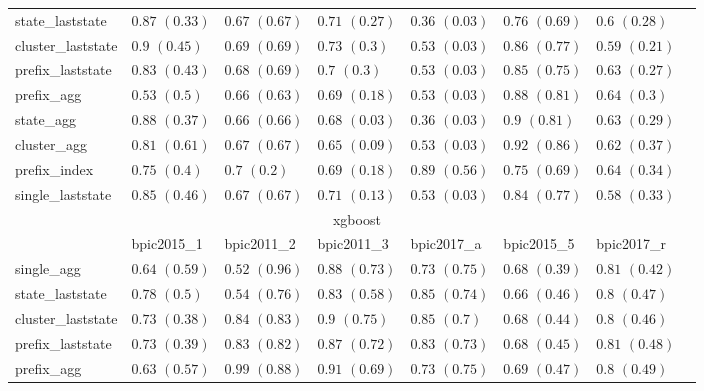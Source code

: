 \documentclass[twoside,11pt]{Latex/Classes/PhDthesisPSnPDF}
\begin{document}
\begin{table}[h]
{\begin{tabular}{llllllll}
		state\_laststate & $0.87$ ${(0.33)}$ & $0.67$ ${(0.67)}$ & $0.71$ ${(0.27)}$ & $0.36$ ${(0.03)}$ & $0.76$ ${(0.69)}$ & $0.6$ ${(0.28)}$ \\
		cluster\_laststate & $0.9$ ${(0.45)}$ & $0.69$ ${(0.69)}$ & $0.73$ ${(0.3)}$ & $0.53$ ${(0.03)}$ & $0.86$ ${(0.77)}$ & $0.59$ ${(0.21)}$ \\
		prefix\_laststate & $0.83$ ${(0.43)}$ & $0.68$ ${(0.69)}$ & $0.7$ ${(0.3)}$ & $0.53$ ${(0.03)}$ & $0.85$ ${(0.75)}$ & $0.63$ ${(0.27)}$ \\
		prefix\_agg & $0.53$ ${(0.5)}$ & $0.66$ ${(0.63)}$ & $0.69$ ${(0.18)}$ & $0.53$ ${(0.03)}$ & $0.88$ ${(0.81)}$ & $0.64$ ${(0.3)}$ \\
		state\_agg & $0.88$ ${(0.37)}$ & $0.66$ ${(0.66)}$ & $0.68$ ${(0.03)}$ & $0.36$ ${(0.03)}$ & $0.9$ ${(0.81)}$ & $0.63$ ${(0.29)}$ \\
		cluster\_agg & $0.81$ ${(0.61)}$ & $0.67$ ${(0.67)}$ & $0.65$ ${(0.09)}$ & $0.53$ ${(0.03)}$ & $0.92$ ${(0.86)}$ & $0.62$ ${(0.37)}$ \\
		prefix\_index & $0.75$ ${(0.4)}$ & $0.7$ ${(0.2)}$ & $0.69$ ${(0.18)}$ & $\mathbf{0.89}$ $\mathbf{(0.56)}$  & $0.75$ ${(0.69)}$ & $0.64$ ${(0.34)}$ \\
		single\_laststate & $0.85$ ${(0.46)}$ & $0.67$ ${(0.67)}$ & $0.71$ ${(0.13)}$ & $0.53$ ${(0.03)}$ & $0.84$ ${(0.77)}$ & $0.58$ ${(0.33)}$ \\
		\bottomrule
		\toprule
		& \multicolumn{5}{c}{xgboost}
		\\
		& bpic2015\_1 & bpic2011\_2 & bpic2011\_3 & bpic2017\_a & bpic2015\_5 & bpic2017\_r
		\\ \midrule
		single\_agg & $0.64$ ${(0.59)}$ & $0.52$ ${(0.96)}$ & $0.88$ ${(0.73)}$ & $0.73$ ${(0.75)}$ & $0.68$ ${(0.39)}$ & $0.81$ ${(0.42)}$ \\
		state\_laststate & $0.78$ ${(0.5)}$ & $0.54$ ${(0.76)}$ & $0.83$ ${(0.58)}$ & $\mathbf{0.85}$ $\mathbf{(0.74)}$  & $0.66$ ${(0.46)}$ & $0.8$ ${(0.47)}$ \\
		cluster\_laststate & $0.73$ ${(0.38)}$ & $0.84$ ${(0.83)}$ & $0.9$ ${(0.75)}$ & $\mathbf{0.85}$ $\mathbf{(0.7)}$  & $0.68$ ${(0.44)}$ & $0.8$ ${(0.46)}$ \\
		prefix\_laststate & $0.73$ ${(0.39)}$ & $0.83$ ${(0.82)}$ & $0.87$ ${(0.72)}$ & $0.83$ ${(0.73)}$ & $0.68$ ${(0.45)}$ & $0.81$ ${(0.48)}$ \\
		prefix\_agg & $0.63$ ${(0.57)}$ & $0.99$ ${(0.88)}$ & $0.91$ ${(0.69)}$ & $0.73$ ${(0.75)}$ & $0.69$ ${(0.47)}$ & $0.8$ ${(0.49)}$ \\

\end{tabular}}
\end{table}
\end{document}

